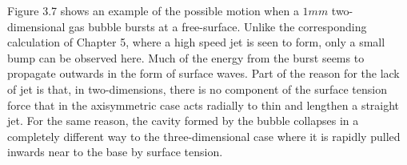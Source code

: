 Figure 3.7 shows an example of the possible motion when a $1mm$ 
two-dimensional gas bubble bursts at a free-surface.
Unlike the corresponding 
calculation of Chapter 5, where a high speed jet is seen to
form, only a small bump can be observed here.
Much of the energy from the burst seems to propagate outwards in
the form of surface waves. Part of the reason for the lack of jet is
that, in two-dimensions, there is no component of the surface tension
force that in the axisymmetric case acts radially to
thin and lengthen a straight jet. For the same reason, the cavity formed by
the bubble collapses in a completely different way to the 
three-dimensional case where it is rapidly pulled inwards near to the
base by surface tension.


